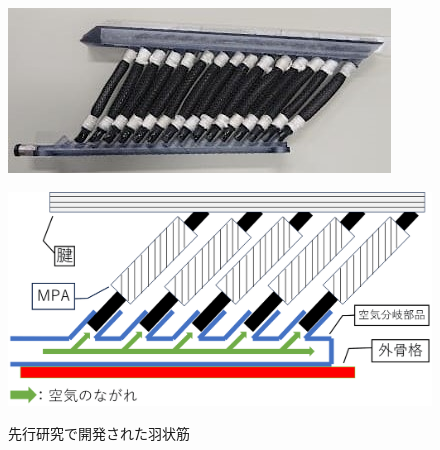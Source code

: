 %
\begin{figure}[ht]
  \begin{minipage}{0.49\hsize}
    \centering  
    \includegraphics[scale=0.6]{image/yobi_syuseki.JPG}
    \label{fig:ujyoukin_real_kako}
  \end{minipage}
  \begin{minipage}{0.49\hsize}
    \centering
    \includegraphics[scale=0.04]{image/air_moshiki.png}
    \label{fig:ujyoukin_moshiki_kako}
  \end{minipage}
  \caption{先行研究で開発された羽状筋}
  \label{fig:ujyoukin_kako}
\end{figure}
%
